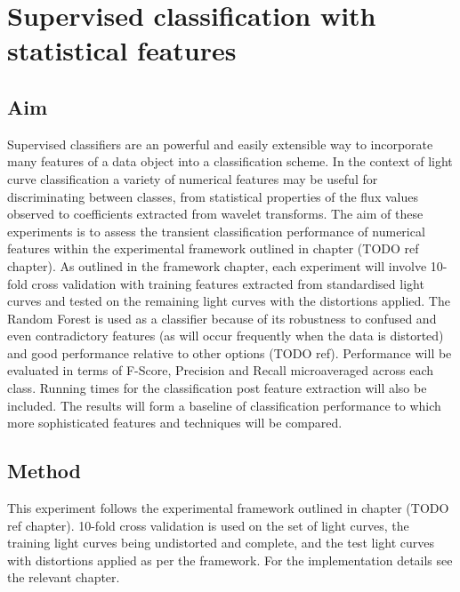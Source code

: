 
%
%
%
%
	
	\chapter{Supervised classification with statistical features} %
	\section{Aim}
		Supervised classifiers are an powerful and easily extensible way to incorporate many features of a data object into a classification scheme. In the context of light curve classification a variety of numerical features may be useful for discriminating between classes, from statistical properties of the flux values observed to coefficients extracted from wavelet transforms. The aim of these experiments is to assess the transient classification performance of numerical features within the experimental framework outlined in chapter (TODO ref chapter). As outlined in the framework chapter, each experiment will involve 10-fold cross validation with training features extracted from standardised light curves and tested on the remaining light curves with the distortions applied. The Random Forest is used as a classifier because of its robustness to confused and even contradictory features (as will occur frequently when the data is distorted) and good performance relative to other options (TODO ref). Performance will be evaluated in terms of F-Score, Precision and Recall microaveraged across each class. Running times for the classification post feature extraction will also be included. The results will form a baseline of classification performance to which more sophisticated features and techniques will be compared.

	\section{Method}
	This experiment follows the experimental framework outlined in chapter (TODO ref chapter). 10-fold cross validation is used on the set of light curves, the training light curves being undistorted and complete, and the test light curves with distortions applied as per the framework. For the implementation details see the relevant chapter.
	
